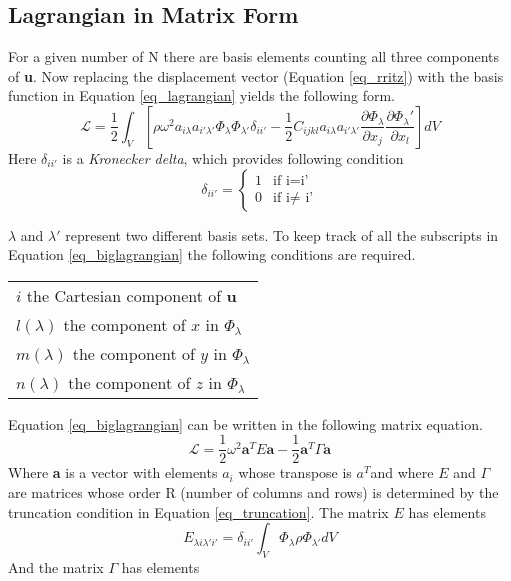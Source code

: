 \begin{doublespacing}
\subsection{Lagrangian in Matrix Form}
For a given number of N  there are basis elements counting all three components of \textbf{u}. Now replacing the displacement vector (Equation \ref{eq_rritz}) with the basis function in Equation \ref{eq_lagrangian} yields the following form.
\begin{equation}
\label{eq_biglagrangian}
\mathcal{L} = \frac{1}{2} \int_V \left[\rho \omega^2 a_{i\lambda} a_{i'\lambda'} \Phi_\lambda \Phi_{\lambda'} \delta_{ii'} - \frac{1}{2} C_{ijkl} a_{i\lambda} a_{i'\lambda'} \frac{\partial{\Phi_\lambda}}{\partial{x_j}} \frac{\partial{\Phi_\lambda'}}{\partial{x_l}} \right] dV
\end{equation}
Here $\delta_{ii'}$ is a \textit{Kronecker delta}, which provides following condition
\begin{equation}
\delta_{ii'} = 
\begin{cases}
1 & \text{if i=i'} \\
0 & \text{if i$\ne$ i'}
\end{cases}
\end{equation}


$\lambda$ and $\lambda'$ represent two different basis sets. To keep track of  all the subscripts in Equation \ref{eq_biglagrangian} the following conditions are required.
\begin{table}[H]
\centering
\begin{tabular}{l}
 $i$ the Cartesian component of \textbf{u}  \\
 $l(\lambda)$ the component of $x$ in $\Phi_\lambda$ \\
 $m(\lambda)$ the component of $y$ in $\Phi_\lambda$ \\
 $n(\lambda)$ the component of $z$ in $\Phi_\lambda$ \\
\end{tabular}
\end{table}
\noindent Equation \ref{eq_biglagrangian} can be written in the following matrix equation.
\begin{equation}
\label{eq_lagrangian_matrix}
\mathcal{L}=\frac{1}{2}\omega^2 \textbf{a}^T E \textbf{a} - \frac{1}{2} \textbf{a}^T \Gamma \textbf{a}
\end{equation}
Where \textbf{a} is a vector with elements $a_i$ whose transpose is $a^T$and where $E$ and $\Gamma$ are matrices whose order R (number of columns and rows) is determined by the truncation condition in Equation \ref{eq_truncation}. The matrix $E$ has elements
\begin{equation}
\label{eq_ematrix}
E_{\lambda i \lambda' i'} = \delta_{ii'} \int_V \Phi_\lambda \rho  \Phi_{\lambda'} dV
\end{equation}
And the matrix $\Gamma$ has elements



\end{doublespacing}
